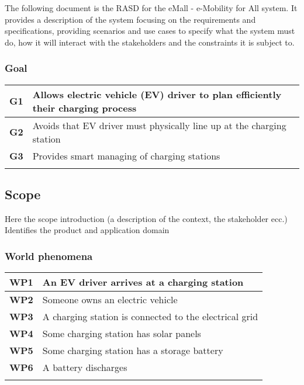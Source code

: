 The following document is the RASD for the eMall - e-Mobility for All system. It provides
a description of the system focusing on the requirements and specifications, providing scenarios and use cases
to specify what the system must do, how it will interact with the stakeholders and the constraints it is subject to.

\subsubsection*{Goal}
\begin{table}[h]
    \begin{tabular}{|l|l|}
        \toprule
        \textbf{G1} & Allows electric vehicle (EV) driver to plan efficiently their charging process \\ \midrule
        \textbf{G2} & Avoids that EV driver must physically line up at the charging station          \\ \midrule
        \textbf{G3} & Provides smart managing of charging stations                                   \\ \midrule
                    &                                                                                \\ \bottomrule
    \end{tabular}
\end{table}

\subsection{Scope}
Here the scope introduction (a description of the context, the stakeholder ecc.)
Identifies the product and application domain
\subsubsection*{World phenomena}
\begin{table}[h]
    \begin{tabular}{|l|l|}
        \toprule
        \textbf{WP1} & An EV driver arrives at a charging station             \\ \midrule
        \textbf{WP2} & Someone owns an electric vehicle                       \\ \midrule
        \textbf{WP3} & A charging station is connected to the electrical grid \\ \midrule
        \textbf{WP4} & Some charging station has solar panels                 \\ \midrule
        \textbf{WP5} & Some charging station has a storage battery            \\ \midrule
        \textbf{WP6} & A battery discharges                                   \\ \midrule
                     &                                                        \\ \bottomrule
    \end{tabular}
\end{table}
